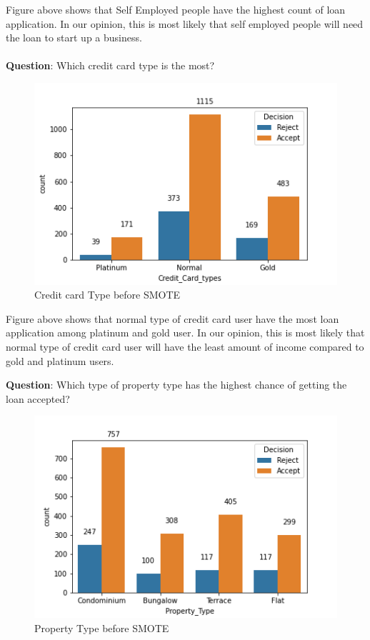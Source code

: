 \documentclass[11pt]{article}
\begin{document}
Figure above shows that Self Employed people have the highest count of loan application. In our opinion, this is most likely that self employed people will need the loan to start up a business. \\ \\

\clearpage
\noindent \textbf{Question}: Which credit card type is the most?
\begin{figure}[h]
\centerline{\includegraphics[scale=0.8]{bSMOTE_ccard_type.png} }
\label{fig:bSmoteCredit}
\caption{Credit card Type before SMOTE}
\end{figure}

Figure above shows that normal type of credit card user have the most loan application among platinum and gold user. In our opinion, this is most likely that normal type of credit card user will have the least amount of income compared to gold and platinum users.
\clearpage

\noindent \textbf{Question}: Which type of property type has the highest chance of getting the loan accepted?
\begin{figure}[h]
\centerline{\includegraphics[scale=0.8]{bSMOTE_property.png} }
\label{fig:bSmoteProperty}
\caption{Property Type before SMOTE}
\end{figure}
\end{document}
